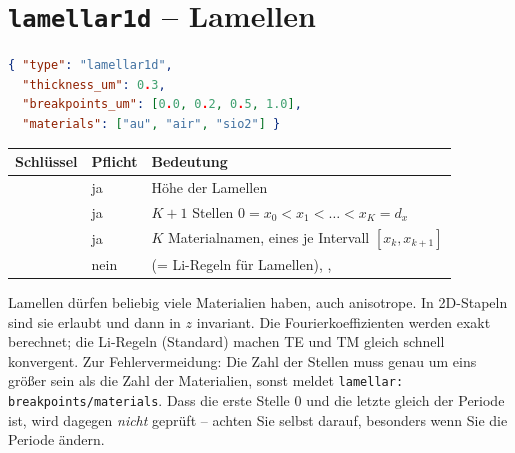 \section{\texttt{lamellar1d} -- Lamellen}
%
\begin{minipage}{0.55\linewidth}
\begin{lstlisting}[language=json]
{ "type": "lamellar1d",
  "thickness_um": 0.3,
  "breakpoints_um": [0.0, 0.2, 0.5, 1.0],
  "materials": ["au", "air", "sio2"] }
\end{lstlisting}
\end{minipage}\hfill
\begin{minipage}{0.4\linewidth}
\centering
{}
\end{minipage}

\begin{center}
\small
\begin{tabularx}{\linewidth}{llY}
\toprule
Schlüssel & Pflicht & Bedeutung \\
\midrule
{} & ja & Höhe der Lamellen \\
 & ja & $K+1$ Stellen $0=x_0<x_1<\dots<x_K=d_x$ \\
 & ja & $K$ Materialnamen, eines je Intervall $[x_{k},x_{k+1}]$ \\
 & nein &  (= Li-Regeln für Lamellen), ,  \\
\bottomrule
\end{tabularx}
\end{center}
Lamellen dürfen beliebig viele Materialien haben, auch anisotrope. In 2D-Stapeln sind sie erlaubt und dann in $z$
invariant. Die Fourierkoeffizienten werden exakt berechnet; die Li-Regeln (Standard) machen TE und TM gleich schnell
konvergent. Zur Fehlervermeidung: Die Zahl der Stellen muss genau um eins größer sein als die Zahl der Materialien,
sonst meldet \FG{} \texttt{lamellar: breakpoints/materials}. Dass die erste Stelle 0 und die letzte gleich der
Periode ist, wird dagegen \emph{nicht} geprüft -- achten Sie selbst darauf, besonders wenn Sie die Periode ändern.

